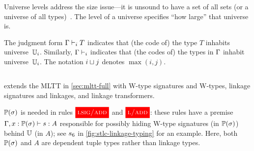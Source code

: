 Universe levels address the size issue---it is unsound to have a set of all sets
(or a universe of all types)~\cite{hurkens1995simplification}.
The level of a universe specifies ``how large'' that universe is.

The judgment form $\goodType{\Gm}{T}{i}$ indicates that (the code of) the type $T$
inhabits universe~$\cU_i$.
Similarly, $\goodCtx{\Gm}{i}$ indicates that (the codes of) the types in $\Gm$
inhabit universe~$\cU_i$.
The notation $i \lcup j$ denotes $\max(i,j)$.



\subsection{\TT}
\label{sec:fmltt-full}

\TT extends the MLTT in \cref{sec:mltt-full} with W-type signatures and W-types,
linkage signatures and linkages, and linkage transformers.






%

$\TyTkg{\lsig}$ is needed in rules $\ruleref{lsig/add}$ and $\ruleref{l/add}$:
these rules have a premise  $\goodTerm{\Gm,x : \TyTkg{\lsig}}{\seal}{A}$
responsible for possibly hiding W-type signatures (in $\TyTkg{\lsig}$) behind $\cU$ (in $A$);
see $\seal_6$ in \cref{fig:stlc-linkage-typing} for an example.
Here, both $\TyTkg{\lsig}$ and $A$ are dependent tuple types rather than linkage types.

